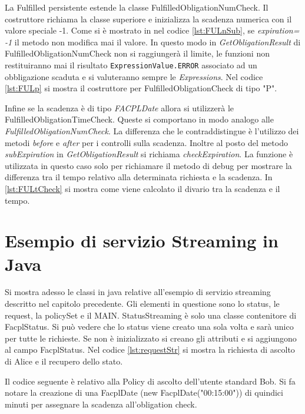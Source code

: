 La Fulfilled persistente estende la classe FulfilledObligationNumCheck.
Il costruttore richiama la classe superiore e inizializza la scadenza numerica con
il valore speciale -1. Come si è mostrato in nel codice \ref{lst:FULnSub}, se \emph{expiration= -1}
il metodo non modifica mai il valore. In questo modo in \emph{GetObligationResult} di
FulfilledObligationNumCheck non si raggiungerà
il limite, le funzioni non restituiranno mai il risultato \texttt{ExpressionValue.ERROR} associato
ad un obbligazione scaduta e si valuteranno sempre le \emph{Expressions}.
Nel codice \ref{lst:FULp} si mostra il costruttore per FulfilledObligationCheck di tipo "P".

Infine se la scadenza è di tipo \emph{FACPLDate} allora si utilizzerà le FulfilledObligationTimeCheck.
Queste si comportano in modo analogo alle \emph{FulfilledObligationNumCheck}. La differenza che le contraddistingue è
l'utilizzo dei metodi \emph{before} e \emph{after} per i controlli sulla scadenza.
Inoltre al posto del metodo \emph{subExpiration} in \emph{GetObligationResult} si richiama \emph{checkExpiration}.
La funzione è utilizzata in questo caso solo per richiamare il metodo di debug per mostrare
la differenza tra il tempo relativo alla determinata richiesta e la scadenza. In \ref{lst:FULtCheck} si
mostra come viene calcolato il divario tra la scadenza e il tempo.

\section{Esempio di servizio Streaming in Java}
\label{sec:Esempio di servizio Streaming in Java}
Si mostra adesso le classi in java relative all'esempio di servizio streaming descritto nel capitolo precedente.
Gli elementi in questione sono lo status, le request, la policySet e il MAIN.
StatusStreaming è solo una classe contenitore di FacplStatus.
Si può vedere che lo status viene creato una sola volta e sarà unico per tutte le richieste. Se non è inizializzato
si creano gli attributi e si aggiungono al campo FacplStatus.
Nel codice \ref{lst:requestStr} si mostra la richiesta di ascolto di Alice e il recupero dello stato.

Il codice seguente è relativo alla Policy di ascolto dell'utente standard Bob. Si fa notare la creazione di una
FacplDate (new FacplDate("00:15:00")) di quindici minuti per assegnare la scadenza all'obligation check.
